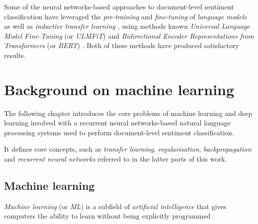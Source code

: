 Some of the neural networks-based approaches to document-level sentiment classification have leveraged the \emph{pre-training} and \emph{fine-tuning} of \emph{language models} as well as \emph{inductive transfer learning} \cite{czaplakardas:ulmfit,poleval2019,korzeniowski:poleval,wawer:polishsentimentshorttexts}, using methods known \emph{Universal Language Model Fine-Tuning} (or \emph{ULMFiT}) \cite{ulmfit} and \emph{Bidirectional Encoder Representations from Transformers} (or \emph{BERT}) \cite{bert}. Both of these methods have produced satisfactory results.













\chapter{Background on machine learning}
\label{chapter:mlbackground}

The following chapter introduces the core problems of machine learning and deep learning involved with a recurrent neural networks-based natural language processing systems used to perform document-level sentiment classification. 

It defines core concepts, such as \emph{transfer learning}, \emph{regularisation}, \emph{backpropagation} and \emph{recurrent neural networks} referred to in the latter parts of this work.

\section{Machine learning}

\emph{Machine learning} (or \emph{ML}) is a subfield of \emph{artificial intelligence} that gives computers the ability to learn without being explicitly programmed \cite{samuel_def_ml}. 


